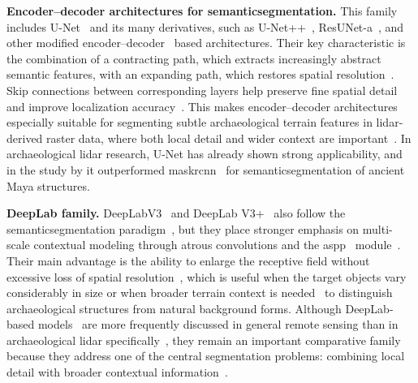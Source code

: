 \textbf{Encoder--decoder architectures for \gls{semanticsegmentation}.}
This family includes U-Net~\cite{ronneberger_u-net_2015} and its many derivatives, such as U-Net++~\cite{zhou_unetplusplus_2018}, ResUNet-a~\cite{diakogiannis_resunet-_2020,he_deep_2016}, and other modified encoder--decoder~\cite{zhang_semantic_2023} based architectures. Their key characteristic is the combination of a contracting path, which extracts increasingly abstract semantic features, with an expanding path, which restores spatial resolution~\cite{ronneberger_u-net_2015,bundzel_semantic_2020}. Skip connections between corresponding layers help preserve fine spatial detail and improve localization accuracy~\cite{ronneberger_u-net_2015,drozdzal_importance_2016}. This makes encoder--decoder architectures especially suitable for segmenting subtle archaeological terrain features in \gls{lidar}-derived raster data, where both local detail and wider context are important~\cite{bundzel_semantic_2020,guyot_objective_2021}. In archaeological \gls{lidar} research, U-Net has already shown strong applicability, and in the study by \textcite{bundzel_semantic_2020} it outperformed \gls{maskrcnn}~\cite{he_mask_2018} for \gls{semanticsegmentation} of ancient Maya structures.

\textbf{DeepLab family.}
DeepLabV3~\cite{chen_rethinking_2017} and DeepLab V3+~\cite{chen_encoder-decoder_2018} also follow the \gls{semanticsegmentation} paradigm~\cite{zhou_dynamic_2023,quan_improved_2021}, but they place stronger emphasis on multi-scale contextual modeling through atrous convolutions and the \gls{aspp}~\cite{chen_rethinking_2017} module~\cite{zhou_dynamic_2023,liu_afnet_2021}. Their main advantage is the ability to enlarge the receptive field without excessive loss of spatial resolution~\cite{zhao_semantic_2022,quan_improved_2021}, which is useful when the target objects vary considerably in size or when broader terrain context is needed~\cite{liu_afnet_2021,diakogiannis_resunet-_2020} to distinguish archaeological structures from natural background forms. Although DeepLab-based models~\cite{quan_improved_2021,} are more frequently discussed in general remote sensing than in archaeological \gls{lidar} specifically~\cite{zhang_unveiling_2024}, they remain an important comparative family because they address one of the central segmentation problems: combining local detail with broader contextual information~\cite{liu_afnet_2021,zhou_dynamic_2023}.

